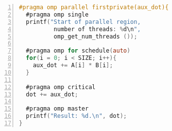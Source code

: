 \begin{lstlisting}[language=C, basicstyle=\ttfamily\scriptsize, numbers=left,
                   frame=no, showspaces=false, showstringspaces=false,
                   caption={\textit{OpenMP} Sample Program}, captionpos=b,
                   numberstyle=\tiny,
                   xleftmargin=0.6cm,
                   label=lst:omp, keywords={%
                       \#pragma,
                       omp, parallel, firstprivate,
                       single, omp_get_num_threads,
                       for, schedule, auto,
                       critical, master,
                       NULL, int, main,
                       void, printf, return%
                   },
                   otherkeywords={::, \#pragma, \#include, <<<,>>>, \&, \*, +, -, /, [, ], >, <}
                       ]
#pragma omp parallel firstprivate(aux_dot){
  #pragma omp single
  printf("Start of parallel region,
          number of threads: %d\n",
          omp_get_num_threads ());

  #pragma omp for schedule(auto)
  for(i = 0; i < SIZE; i++){
    aux_dot += A[i] * B[i];
  }

  #pragma omp critical
  dot += aux_dot;

  #pragma omp master
  printf("Result: %d.\n", dot);
}
\end{lstlisting}
